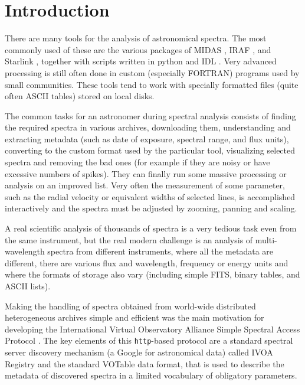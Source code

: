 \documentclass[final,authoryear,5p,times,twocolumn]{elsarticle}
\begin{document}

\newcommand{\qjras}{QJRAS}
\newcommand{\apj}{ApJ}
\newcommand{\aap}{A\&A}
\newcommand{\aspconf}{ASP Conf.\ Ser.}

\newcommand{\ascl}[1]{\href{http://www.ascl.net/#1}{ascl:#1}}

\section{Introduction}

There are many tools for the analysis of astronomical spectra.  The most
commonly used of these are the various packages of MIDAS
\citep[][\ascl{1302.017}]{1992ASPC...25..115W}, IRAF
\citep[][\ascl{9911.002}]{2012ASPC..461..595F}, and Starlink
\citep[][\ascl{1110.012}]{1982QJRAS..23..485D}, together with scripts
written in python \citep[e.g.,][]{2013A&A...558A..33A} and IDL \citep[e.g.,][]{1993ASPC...52..246L}.
Very advanced processing is still often done in custom
(especially FORTRAN) programs used by small communities.  These tools tend to
work with specially formatted files (quite often ASCII tables) stored on local
disks.

The common tasks for an astronomer during spectral analysis consists of finding
the required spectra in various archives, downloading them, understanding and
extracting metadata (such as date of exposure, spectral range, and flux units),
converting to the custom format used by the particular tool, visualizing
selected spectra and  removing the bad ones (for example if they are
noisy or have excessive numbers of spikes). They can finally
run some massive processing or analysis on an
improved list.  Very often the measurement of some parameter, such as the radial
velocity or equivalent widths of selected lines, is accomplished interactively
and the spectra must be adjusted by zooming, panning and scaling.

A real scientific analysis of thousands of spectra is a very
tedious task even from the same instrument, but the real modern challenge is an
analysis of multi-wavelength spectra from different instruments, where all the
metadata are different, there are various flux and wavelength, frequency or
energy units  and where the formats of storage also vary (including simple FITS, binary
tables, and ASCII lists).

Making the handling of spectra obtained from world-wide distributed
heterogeneous archives simple and efficient was the main motivation for
developing the International Virtual Observatory Alliance Simple Spectral
Access Protocol \citep[IVOA SSAP;][]{ssap}. The key elements of this
\texttt{http}-based protocol are a standard spectral server discovery mechanism (a
Google for astronomical data) called IVOA Registry \citep{registry} and  the
standard VOTable data format\citep{2004tivo.conf..118O},
that is used to describe the metadata of discovered spectra in a limited vocabulary of
obligatory parameters.
\end{document}
